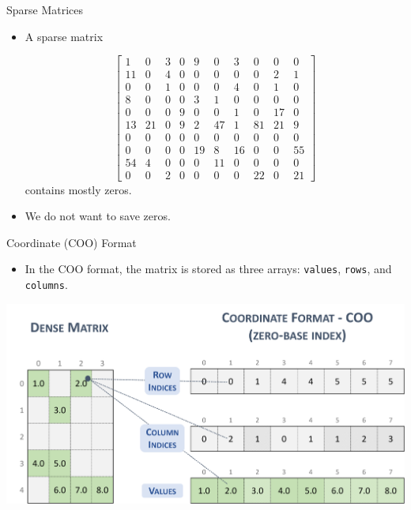 \documentclass{beamer}
\begin{document}
\begin{frame}{Sparse Matrices}
    \begin{itemize}
    \item A sparse matrix 
        
    \[\left[\begin{array}{llllllllll}
       1 & 0 & 3 & 0 & 9 & 0 & 3 & 0 & 0 & 0 \\
       11 & 0 & 4 & 0 & 0 & 0 & 0 & 0 & 2 & 1 \\
       0 & 0 & 1 & 0 & 0 & 0 & 4 & 0 & 1 & 0 \\
       8 & 0 & 0 & 0 & 3 & 1 & 0 & 0 & 0 & 0 \\
       0 & 0 & 0 & 9 & 0 & 0 & 1 & 0 & 17 & 0 \\
       13 & 21 & 0 & 9 & 2 & 47 & 1 & 81 & 21 & 9 \\
       0 & 0 & 0 & 0 & 0 & 0 & 0 & 0 & 0 & 0 \\
       0 & 0 & 0 & 0 & 19 & 8 & 16 & 0 & 0 & 55 \\
       54 & 4 & 0 & 0 & 0 & 11 & 0 & 0 & 0 & 0 \\
       0 & 0 & 2 & 0 & 0 & 0 & 0 & 22 & 0 & 21 
        \end{array}\right]
    \] contains mostly zeros.
    \item We do not want to save zeros.
\end{itemize}
\end{frame}
\begin{frame}{Coordinate (COO) Format}
    \begin{itemize}
        \item In the COO format, the matrix is stored as three arrays: \texttt{values}, \texttt{rows}, and \texttt{columns}.
    \end{itemize}
    \centerline{\includegraphics[width=\textwidth]{coo.png}}

\end{frame}
\end{document}

